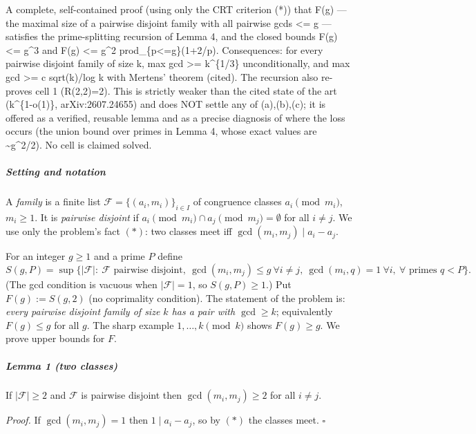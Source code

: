 
A complete, self-contained proof (using only the CRT criterion (*)) that
F(g) --- the maximal size of a pairwise disjoint family with all
pairwise gcds \textless= g --- satisfies the prime-splitting recursion
of Lemma 4, and the closed bounds F(g) \textless= g\^{}3 and F(g)
\textless= g\^{}2 prod\_\{p\textless=g\}(1+2/p). Consequences: for every
pairwise disjoint family of size k, max gcd \textgreater= k\^{}\{1/3\}
unconditionally, and max gcd \textgreater= c sqrt(k)/log k with Mertens'
theorem (cited). The recursion also re-proves cell 1 (R(2,2)=2). This is
strictly weaker than the cited state of the art (k\^{}\{1-o(1)\},
arXiv:2607.24655) and does NOT settle any of (a),(b),(c); it is offered
as a verified, reusable lemma and as a precise diagnosis of where the
loss occurs (the union bound over primes in Lemma 4, whose exact values
are \textasciitilde g\^{}2/2). No cell is claimed solved.


\subparagraph{Setting and notation}\label{setting-and-notation}

A \emph{family} is a finite list \(\mathcal F=\{(a_i,m_i)\}_{i\in I}\)
of congruence classes \(a_i \pmod{m_i}\), \(m_i\ge 1\). It is
\emph{pairwise disjoint} if
\(a_i \pmod{m_i}\cap a_j\pmod{m_j}=\emptyset\) for all \(i\ne j\). We
use only the problem's fact \((*)\): two classes meet iff
\(\gcd(m_i,m_j)\mid a_i-a_j\).

For an integer \(g\ge 1\) and a prime \(P\) define
\[S(g,P)=\sup\Big\{|\mathcal F| :\ \mathcal F \text{ pairwise disjoint},\ \gcd(m_i,m_j)\le g\ \forall i\ne j,\ \gcd(m_i,q)=1\ \forall i,\ \forall \text{ primes } q<P\Big\}.\]
(The gcd condition is vacuous when \(|\mathcal F|=1\), so
\(S(g,P)\ge 1\).) Put \(F(g):=S(g,2)\) (no coprimality condition). The
statement of the problem is: \emph{every pairwise disjoint family of
size \(k\) has a pair with \(\gcd\ge k\)}; equivalently \(F(g)\le g\)
for all \(g\). The sharp example \(1,\dots,k \pmod k\) shows
\(F(g)\ge g\). We prove upper bounds for \(F\).

\subparagraph{Lemma 1 (two classes)}\label{lemma-1-two-classes}

If \(|\mathcal F|\ge 2\) and \(\mathcal F\) is pairwise disjoint then
\(\gcd(m_i,m_j)\ge 2\) for all \(i\ne j\).

\emph{Proof.} If \(\gcd(m_i,m_j)=1\) then \(1\mid a_i-a_j\), so by
\((*)\) the classes meet. \(\square\)

